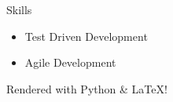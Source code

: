 \documentclass{article}
\begin{document}
\huge{Skills}
\begin{itemize}
  \item Test Driven Development
  \item Agile Development
\end{itemize}
Rendered with Python \& \LaTeX!
\end{document}
